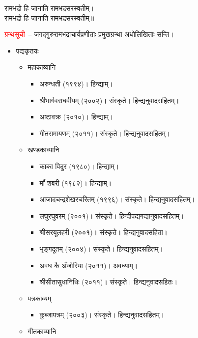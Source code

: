\vspace{-2mm}
\begin{center}
रामभद्रो हि जानाति रामभद्रसरस्वतीम्।\nopagebreak\\
रामभद्रो हि जानाति रामभद्रसरस्वतीम्॥\nopagebreak\\
\end{center}
\begin{sloppypar}\justifying\noindent\hspace{10mm} \textcolor{red}{ग्रन्थसूची}~– जगद्गुरु\-रामभद्राचार्य\-प्रणीताः प्रमुख\-ग्रन्था अधोलिखिताः सन्ति।\end{sloppypar}
\begin{itemize}
\item पद्यकृतयः
	\begin{itemize}
	\item महाकाव्यानि
	\begin{itemize}
		\item अरुन्धती (१९९४)। हिन्द्याम्।
		\item श्रीभार्गवराघवीयम् (२००२)। संस्कृते। हिन्द्यनुवादसहितम्।
		\item अष्टावक्र (२०१०)। हिन्द्याम्।
		\item गीतरामायणम् (२०११)। संस्कृते। हिन्द्यनुवादसहितम्।
	\end{itemize}
	\item खण्डकाव्यानि
	\begin{itemize}
		\item काका विदुर (१९८०)। हिन्द्याम्।
		\item माँ शबरी (१९८२)। हिन्द्याम्।
		\item आजादचन्द्रशेखरचरितम् (१९९६)। संस्कृते। हिन्द्यनुवादसहितम्।
		\item लघुरघुवरम् (२००१)। संस्कृते। हिन्दीपद्यगद्यानुवादसहितम्।
		\item श्रीसरयूलहरी (२००१)। संस्कृते। हिन्द्यनुवादसहिता।
		\item भृङ्गदूतम् (२००४)। संस्कृते। हिन्द्यनुवादसहितम्।
		\item अवध कै अँजोरिया (२०११)। अवध्याम्। 
		\item श्रीसीतासुधानिधिः (२०११)। संस्कृते। हिन्द्यनुवादसहितः।
	\end{itemize}
	\item पत्रकाव्यम्
	\begin{itemize}
		\item कुब्जापत्रम् (२००३)। संस्कृते। हिन्द्यनुवादसहितम्।
	\end{itemize}
	\item गीतकाव्यानि

\end{itemize}
\end{itemize}
